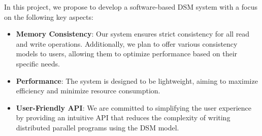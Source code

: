 \documentclass[journal]{IEEEtran}
\begin{document}
In this project, we propose to develop a software-based DSM system with a focus on the following key aspects:
\begin{itemize}
\item \textbf{Memory Consistency}: Our system ensures strict consistency for all read and write operations. Additionally, we plan to offer various consistency models to users, allowing them to optimize performance based on their specific needs.
\item \textbf{Performance}: The system is designed to be lightweight, aiming to maximize efficiency and minimize resource consumption.
\item \textbf{User-Friendly API}: We are committed to simplifying the user experience by providing an intuitive API that reduces the complexity of writing distributed parallel programs using the DSM model.
\end{itemize}




\end{document}
